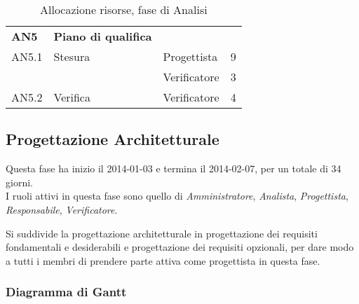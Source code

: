 \begin{table}[H]
\begin{tabular}{ l l l c  }
	\hline
	\textbf{AN5} & \textbf{Piano di qualifica} \\
	\cline{3-4}
	AN5.1 & Stesura & Progettista& 9\\ 
    & & Verificatore & 3 \\
    \cline{3-4}
	AN5.2 & Verifica & Verificatore &  4\\
	
	\hline
	\end{tabular}
	\caption{Allocazione risorse, fase di Analisi}
	\end{table}

	
	\subsection{Progettazione Architetturale}
	
Questa fase ha inizio il 2014-01-03 e termina il 2014-02-07, per un totale di 34  giorni. \\
I ruoli attivi in questa fase sono quello di \textit{Amministratore}, \textit{Analista}, \textit{Progettista}, \textit{Responsabile}, \textit{Verificatore}.

Si suddivide la progettazione architetturale in progettazione dei requisiti fondamentali e desiderabili e progettazione dei requisiti opzionali, per dare modo a tutti i membri di prendere parte attiva come progettista in questa fase.

\subsubsection{Diagramma di Gantt}

